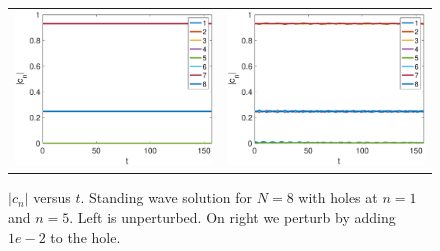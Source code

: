 \documentclass[12pt]{article}
\begin{document}
\begin{enumerate}
\begin{figure}[H]
\begin{center}
\begin{tabular}{cc}
\includegraphics[width=7cm]{images/evenhole8.eps} &
\includegraphics[width=7cm]{images/evenhole8perturbed.eps} 
\end{tabular}
\end{center}
\caption{$|c_n|$ versus $t$. Standing wave solution for $N = 8$ with holes at $n = 1$ and $n = 5$. Left is unperturbed. On right we perturb by adding $1e-2$ to the hole.}
\label{fig:oddhole7}
\end{figure}
\end{enumerate}



\end{document}
